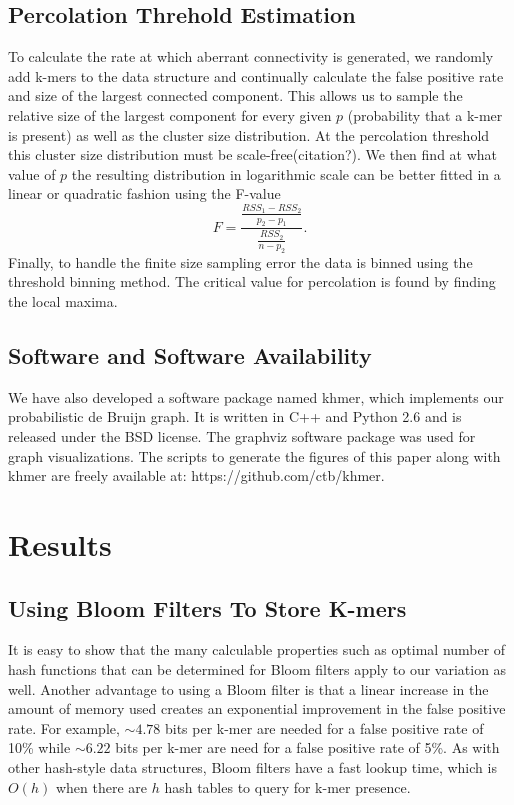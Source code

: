 \documentclass[12pt]{article} \usepackage{simplemargins}
\begin{document}
\subsection{Percolation Threhold Estimation}
To calculate the rate at which aberrant connectivity is generated, 
we randomly add k-mers to the data structure 
and continually calculate the false positive rate and size of the largest connected 
component. This allows us to sample the relative size of the largest component for every 
given $p$ (probability that a k-mer is present) as well as the cluster size distribution. 
At the percolation threshold this cluster size distribution must be scale-free(citation?). 
We then find at what value of $p$ the resulting 
distribution in logarithmic 
scale can be better fitted in a linear or quadratic fashion using 
the F-value
\newline
\newline
\begin{displaymath}
F=\frac{\frac{RSS_1-RSS_2}{p_2-p_1}}{\frac{RSS_2}{n-p_2}}.
\end{displaymath}
Finally, to handle the finite size sampling error the data is binned using the 
threshold binning method\cite{adami2002critical}. The critical value for percolation is found 
by finding the local maxima.

\subsection{Software and Software Availability}

We have also developed a software package named khmer, which
implements our probabilistic de Bruijn graph.  It is written in C++
and Python 2.6 and is released under the BSD license. The graphviz software 
package was used for graph visualizations. The scripts to 
generate the figures of this paper along with khmer are freely available
at: https://github.com/ctb/khmer.

\section{Results}

\subsection{Using Bloom Filters To Store K-mers}
It is easy to show that the many
calculable properties such as optimal number of hash functions that
can be determined for Bloom filters apply to our variation as well.  
Another advantage to
using a Bloom filter is that a linear increase in the amount of memory
used creates an exponential improvement in the false positive
rate. For example, $\sim4.78$ bits per k-mer are needed for a false
positive rate of 10\% while $\sim6.22$ bits per k-mer are need for a false
positive rate of
5\%. As with other hash-style data structures, Bloom filters have a
fast lookup time, which is $O(h)$ when there are $h$ hash tables to query
for k-mer presence. 
\end{document}
